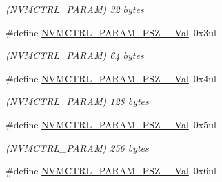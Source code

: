 \begin{DoxyCompactItemize}
\begin{DoxyCompactList}\small\item\em (N\+V\+M\+C\+T\+R\+L\+\_\+\+P\+A\+R\+A\+M) 32 bytes \end{DoxyCompactList}\item 
\hypertarget{group___s_a_m_l21___n_v_m_c_t_r_l_ga464e20508682489f9283f535148c27b1}{}\#define \hyperlink{group___s_a_m_l21___n_v_m_c_t_r_l_ga464e20508682489f9283f535148c27b1}{N\+V\+M\+C\+T\+R\+L\+\_\+\+P\+A\+R\+A\+M\+\_\+\+P\+S\+Z\+\_\+\_\+\+Val}~0x3ul\label{group___s_a_m_l21___n_v_m_c_t_r_l_ga464e20508682489f9283f535148c27b1}

\begin{DoxyCompactList}\small\item\em (N\+V\+M\+C\+T\+R\+L\+\_\+\+P\+A\+R\+A\+M) 64 bytes \end{DoxyCompactList}\item 
\hypertarget{group___s_a_m_l21___n_v_m_c_t_r_l_gac8f620598445b047b44dfc8081439744}{}\#define \hyperlink{group___s_a_m_l21___n_v_m_c_t_r_l_gac8f620598445b047b44dfc8081439744}{N\+V\+M\+C\+T\+R\+L\+\_\+\+P\+A\+R\+A\+M\+\_\+\+P\+S\+Z\+\_\+\_\+\+Val}~0x4ul\label{group___s_a_m_l21___n_v_m_c_t_r_l_gac8f620598445b047b44dfc8081439744}

\begin{DoxyCompactList}\small\item\em (N\+V\+M\+C\+T\+R\+L\+\_\+\+P\+A\+R\+A\+M) 128 bytes \end{DoxyCompactList}\item 
\hypertarget{group___s_a_m_l21___n_v_m_c_t_r_l_ga7f53d9c6161bf83ef35275e90438e9e2}{}\#define \hyperlink{group___s_a_m_l21___n_v_m_c_t_r_l_ga7f53d9c6161bf83ef35275e90438e9e2}{N\+V\+M\+C\+T\+R\+L\+\_\+\+P\+A\+R\+A\+M\+\_\+\+P\+S\+Z\+\_\+\_\+\+Val}~0x5ul\label{group___s_a_m_l21___n_v_m_c_t_r_l_ga7f53d9c6161bf83ef35275e90438e9e2}

\begin{DoxyCompactList}\small\item\em (N\+V\+M\+C\+T\+R\+L\+\_\+\+P\+A\+R\+A\+M) 256 bytes \end{DoxyCompactList}\item 
\hypertarget{group___s_a_m_l21___n_v_m_c_t_r_l_gac19388a03c011b81e82b35dfd7da69b1}{}\#define \hyperlink{group___s_a_m_l21___n_v_m_c_t_r_l_gac19388a03c011b81e82b35dfd7da69b1}{N\+V\+M\+C\+T\+R\+L\+\_\+\+P\+A\+R\+A\+M\+\_\+\+P\+S\+Z\+\_\+\_\+\+Val}~0x6ul\label{group___s_a_m_l21___n_v_m_c_t_r_l_gac19388a03c011b81e82b35dfd7da69b1}


\end{DoxyCompactItemize}
